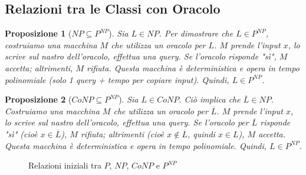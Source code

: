 \documentclass[a4paper]{article}
\newtheorem{proposition}{Proposizione}
\begin{document}
\subsection{Relazioni tra le Classi con Oracolo}
\begin{proposition}[$NP \subseteq P^{NP}$]
Sia $L \in NP$. Per dimostrare che $L \in P^{NP}$, costruiamo una macchina $M$ che utilizza un oracolo per $L$. $M$ prende l'input $x$, lo scrive sul nastro dell'oracolo, effettua una query. Se l'oracolo risponde "sì", $M$ accetta; altrimenti, $M$ rifiuta. Questa macchina è deterministica e opera in tempo polinomiale (solo 1 query + tempo per copiare input). Quindi, $L \in P^{NP}$.
\end{proposition}

\begin{proposition}[$CoNP \subseteq P^{NP}$]
Sia $L \in CoNP$. Ciò implica che $\overline{L} \in NP$. Costruiamo una macchina $M$ che utilizza un oracolo per $\overline{L}$. $M$ prende l'input $x$, lo scrive sul nastro dell'oracolo, effettua una query. Se l'oracolo per $\overline{L}$ risponde "sì" (cioè $x \in \overline{L}$), $M$ rifiuta; altrimenti (cioè $x \notin \overline{L}$, quindi $x \in L$), $M$ accetta. Questa macchina è deterministica e opera in tempo polinomiale. Quindi, $L \in P^{NP}$.
\end{proposition}

\begin{figure}[h]
    \centering
    \caption{Relazioni iniziali tra $P$, $NP$, $CoNP$ e $P^{NP}$}
\end{figure}
\end{document}
